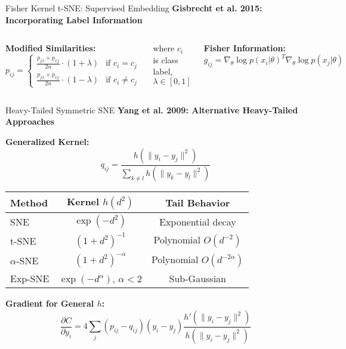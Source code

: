   \begin{frame}{Fisher Kernel t-SNE: Supervised Embedding}
  \textbf{Gisbrecht et al. 2015: Incorporating Label Information}
  
  \begin{columns}
  \textbf{Modified Similarities:}
  $$p_{ij} = \begin{cases}
  \frac{p_{j|i} + p_{i|j}}{2n} \cdot (1 + \lambda) & \text{if } c_i = c_j \\
  \frac{p_{j|i} + p_{i|j}}{2n} \cdot (1 - \lambda) & \text{if } c_i \neq c_j
  \end{cases}$$
    
    where $c_i$ is class label, $\lambda \in [0,1]$
    
    \textbf{Fisher Information:}
  $$g_{ij} = \nabla_\theta \log p(x_i|\theta)^T \nabla_\theta \log p(x_j|\theta)$$
    
  \begin{center}
  \end{center}
  \end{columns}
  
  \end{frame}
  
  \begin{frame}{Heavy-Tailed Symmetric SNE}
  \textbf{Yang et al. 2009: Alternative Heavy-Tailed Approaches}
  
  \textbf{Generalized Kernel:}
  $$q_{ij} = \frac{h(\|y_i - y_j\|^2)}{\sum_{k \neq l} h(\|y_k - y_l\|^2)}$$
    
    \begin{center}
  \begin{tabular}{l|c|c}
  \textbf{Method} & \textbf{Kernel $h(d^2)$} & \textbf{Tail Behavior} \\
  \hline
  SNE & $\exp(-d^2)$ & Exponential decay \\
  t-SNE & $(1 + d^2)^{-1}$ & Polynomial $O(d^{-2})$ \\
  $\alpha$-SNE & $(1 + d^2)^{-\alpha}$ & Polynomial $O(d^{-2\alpha})$ \\
  Exp-SNE & $\exp(-d^\alpha)$, $\alpha < 2$ & Sub-Gaussian \\
  \end{tabular}
  \end{center}
  
  \textbf{Gradient for General $h$:}
  $$\frac{\partial C}{\partial y_i} = 4\sum_j (p_{ij} - q_{ij})(y_i - y_j)\frac{h'(\|y_i - y_j\|^2)}{h(\|y_i - y_j\|^2)}$$
\end{frame}

